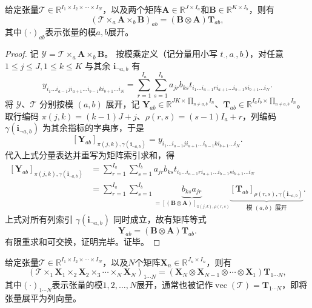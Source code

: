 \begin{property}\label{prop:kronecker-kron}
    给定张量\( \mathcal{T} \in \mathbb{R}^{I_1 \times I_2 \times \cdots \times I_N} \)，以及两个矩阵\( \mathbf{A} \in \mathbb{R}^{J \times I_a} \)和\( \mathbf{B} \in \mathbb{R}^{K \times I_b} \)，则有
    \[
        (\mathcal{T} \times_a \mathbf{A} \times_b \mathbf{B})_{ab} = (\mathbf{B} \otimes \mathbf{A}) \mathbf{T}_{ab},
    \]
    其中\( (\cdot)_{ab} \)表示张量的模\( a,b \)展开。
\end{property}
\begin{proof}
记 \(\mathcal{Y}=\mathcal{T}\times_a \mathbf{A}\times_b \mathbf{B}\)。
按模乘定义（记分量用小写 \(t_{\cdot},a_{\cdot},b_{\cdot}\)），对任意
\(1\le j\le J,1\le k\le K\) 与其余 \(\bm{i}_{\neg a,b}\) 有
\[
  y_{i_1 \dots i_{a-1} j i_{a+1} \dots i_{b-1} k i_{b+1} \dots i_N}
  =
  \sum_{r=1}^{I_a}\sum_{s=1}^{I_b}
  a_{j r} b_{k s}
  t_{i_1 \dots i_{a-1} r i_{a+1} \dots i_{b-1} s i_{b+1} \dots i_N}.
\]
将 \(\mathcal{Y}\)、\(\mathcal{T}\) 分别按模 \((a,b)\) 展开，记
\(\mathbf{Y}_{ab}\in\mathbb{R}^{JK\times \prod_{n\neq a,b} I_n}\)、\(\mathbf{T}_{ab}\in\mathbb{R}^{I_aI_b\times \prod_{n\neq a,b} I_n}\)。
取行编码
\(\pi(j,k)=(k-1)J+j\)、\(\rho(r,s)=(s-1)I_a+r\)，列编码
\(\gamma(\bm{i}_{\neg a,b})\) 为其余指标的字典序，于是
\[
  [\mathbf{Y}_{ab}]_{\pi(j,k),\gamma(\bm{i}_{\neg a,b})}
  =
  y_{i_1 \dots i_{a-1} j i_{a+1} \dots i_{b-1} k i_{b+1} \dots i_N}.
\]
代入上式分量表达并重写为矩阵索引求和，得
\[
\begin{aligned}
  [\mathbf{Y}_{ab}]_{\pi(j,k),\gamma(\bm{i}_{\neg a,b})}
  &= \sum_{r=1}^{I_a}\sum_{s=1}^{I_b}
     a_{j r} b_{k s}
     t_{i_1 \dots i_{a-1} r i_{a+1} \dots i_{b-1} s i_{b+1} \dots i_N} \\
  &= \sum_{r=1}^{I_a}\sum_{s=1}^{I_b}
     \underbrace{b_{k s} a_{j r}}_{=[(\mathbf{B}\otimes\mathbf{A})]_{\pi(j,k),\rho(r,s)}}
     \underbrace{[\mathbf{T}_{ab}]_{\rho(r,s),\gamma(\bm{i}_{\neg a,b})}}_{\text{模 }(a,b)\text{ 展开}} .
\end{aligned}
\]
上式对所有列索引 \(\gamma(\bm{i}_{\neg a,b})\) 同时成立，故有矩阵等式
\[
  \mathbf{Y}_{ab} = (\mathbf{B}\otimes\mathbf{A})\mathbf{T}_{ab}.
\]
有限重求和可交换，证明完毕。证毕。
\end{proof}

\begin{corollary}\label{cor:kronecker-kron}
    给定张量\( \mathcal{T} \in \mathbb{R}^{I_1 \times I_2 \times \cdots \times I_N} \)，以及\( N \)个矩阵\( \mathbf{X}_n \in \mathbb{R}^{J_n \times I_n} \)，则有
    \[
        (\mathcal{T} \times_1 \mathbf{X}_1 \times_2 \mathbf{X}_2 \times_3 \cdots \times_N \mathbf{X}_N)_{1\cdots N} = (\mathbf{X}_N \otimes \mathbf{X}_{N-1} \otimes \cdots \otimes \mathbf{X}_1) \mathbf{T}_{1\cdots N},
    \]
    其中\( (\cdot)_{1\cdots N} \)表示张量的模\( 1,2,\ldots,N \)展开，通常也被记作\( \operatorname{vec}( \mathcal{T} ) = \mathbf{T}_{1\cdots N} \)，即将张量展平为列向量。
\end{corollary}

